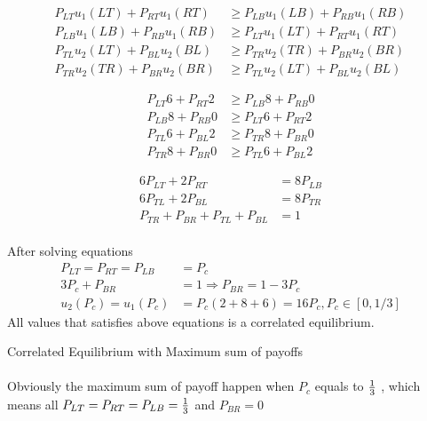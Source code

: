 \documentclass[
  course = {{IE579 Game Theory and Multi-Agent Reinforcement Learning}},
  assignment = 1,
  name = {{Mohammad Mahdi Rahimi}},
  studentnumber = {{20208244}},
  email = {{mahi@kaist.ac.kr}},
  firstexercise = 1
]{aga-homework}
\begin{document}
\begin{equation}
    \begin{split}
    P_{LT}u_1(LT) + P_{RT}u_1(RT) & \ge P_{LB}u_1(LB) + P_{RB}u_1(RB) \\
    P_{LB}u_1(LB) + P_{RB}u_1(RB) & \ge P_{LT}u_1(LT) + P_{RT}u_1(RT) \\
    P_{TL}u_2(LT) + P_{BL}u_2(BL) & \ge P_{TR}u_2(TR) + P_{BR}u_2(BR) \\
    P_{TR}u_2(TR) + P_{BR}u_2(BR) & \ge P_{TL}u_2(LT) + P_{BL}u_2(BL)
    \end{split}
\end{equation}

\begin{equation}
    \begin{split}
    P_{LT}6 + P_{RT}2 & \ge P_{LB}8 + P_{RB}0 \\
    P_{LB}8 + P_{RB}0 & \ge P_{LT}6 + P_{RT}2\\
    P_{TL}6 + P_{BL}2 & \ge P_{TR}8 + P_{BR}0 \\
    P_{TR}8 + P_{BR}0 & \ge P_{TL}6 + P_{BL}2
    \end{split}
\end{equation}

\begin{equation}
    \begin{split}
    6P_{LT} + 2P_{RT} & = 8P_{LB} \\
    6P_{TL} + 2P_{BL} & = 8P_{TR} \\
    P_{TR} + P_{BR} + P_{TL} + P_{BL} & = 1
    \end{split}
\end{equation}
\\
After solving equations
\\
\begin{equation}
    \begin{split}
    P_{LT} = P_{RT} = P_{LB} &= P_c\\
    3P_c + P_{BR}& = 1 \Rightarrow P_{BR} = 1 - 3P_c\\
    u_2(P_c) = u_1(P_c) &= P_c(2 + 8 + 6) = 16P_c, P_c \in [0, 1/3]
    \end{split}
\end{equation}
All values that satisfies above equations is a correlated equilibrium.

\subexercise Correlated Equilibrium with Maximum sum of payoffs
\\
\\
Obviously the maximum sum of payoff happen when $P_c$ equals to ${1 \over 3}$ , which means all $P_{LT} = P_{RT} = P_{LB} = {1 \over 3}$ and  $P_{BR} = 0$
\end{document}
